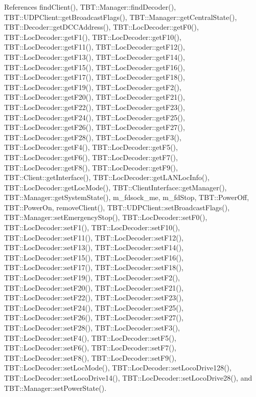 References find\+Client(), T\+B\+T\+::\+Manager\+::find\+Decoder(), T\+B\+T\+::\+U\+D\+P\+Client\+::get\+Broadcast\+Flags(), T\+B\+T\+::\+Manager\+::get\+Central\+State(), T\+B\+T\+::\+Decoder\+::get\+D\+C\+C\+Address(), T\+B\+T\+::\+Loc\+Decoder\+::get\+F0(), T\+B\+T\+::\+Loc\+Decoder\+::get\+F1(), T\+B\+T\+::\+Loc\+Decoder\+::get\+F10(), T\+B\+T\+::\+Loc\+Decoder\+::get\+F11(), T\+B\+T\+::\+Loc\+Decoder\+::get\+F12(), T\+B\+T\+::\+Loc\+Decoder\+::get\+F13(), T\+B\+T\+::\+Loc\+Decoder\+::get\+F14(), T\+B\+T\+::\+Loc\+Decoder\+::get\+F15(), T\+B\+T\+::\+Loc\+Decoder\+::get\+F16(), T\+B\+T\+::\+Loc\+Decoder\+::get\+F17(), T\+B\+T\+::\+Loc\+Decoder\+::get\+F18(), T\+B\+T\+::\+Loc\+Decoder\+::get\+F19(), T\+B\+T\+::\+Loc\+Decoder\+::get\+F2(), T\+B\+T\+::\+Loc\+Decoder\+::get\+F20(), T\+B\+T\+::\+Loc\+Decoder\+::get\+F21(), T\+B\+T\+::\+Loc\+Decoder\+::get\+F22(), T\+B\+T\+::\+Loc\+Decoder\+::get\+F23(), T\+B\+T\+::\+Loc\+Decoder\+::get\+F24(), T\+B\+T\+::\+Loc\+Decoder\+::get\+F25(), T\+B\+T\+::\+Loc\+Decoder\+::get\+F26(), T\+B\+T\+::\+Loc\+Decoder\+::get\+F27(), T\+B\+T\+::\+Loc\+Decoder\+::get\+F28(), T\+B\+T\+::\+Loc\+Decoder\+::get\+F3(), T\+B\+T\+::\+Loc\+Decoder\+::get\+F4(), T\+B\+T\+::\+Loc\+Decoder\+::get\+F5(), T\+B\+T\+::\+Loc\+Decoder\+::get\+F6(), T\+B\+T\+::\+Loc\+Decoder\+::get\+F7(), T\+B\+T\+::\+Loc\+Decoder\+::get\+F8(), T\+B\+T\+::\+Loc\+Decoder\+::get\+F9(), T\+B\+T\+::\+Client\+::get\+Interface(), T\+B\+T\+::\+Loc\+Decoder\+::get\+L\+A\+N\+Loc\+Info(), T\+B\+T\+::\+Loc\+Decoder\+::get\+Loc\+Mode(), T\+B\+T\+::\+Client\+Interface\+::get\+Manager(), T\+B\+T\+::\+Manager\+::get\+System\+State(), m\+\_\+fdsock\+\_\+me, m\+\_\+fd\+Stop, T\+B\+T\+::\+Power\+Off, T\+B\+T\+::\+Power\+On, remove\+Client(), T\+B\+T\+::\+U\+D\+P\+Client\+::set\+Broadcast\+Flags(), T\+B\+T\+::\+Manager\+::set\+Emergency\+Stop(), T\+B\+T\+::\+Loc\+Decoder\+::set\+F0(), T\+B\+T\+::\+Loc\+Decoder\+::set\+F1(), T\+B\+T\+::\+Loc\+Decoder\+::set\+F10(), T\+B\+T\+::\+Loc\+Decoder\+::set\+F11(), T\+B\+T\+::\+Loc\+Decoder\+::set\+F12(), T\+B\+T\+::\+Loc\+Decoder\+::set\+F13(), T\+B\+T\+::\+Loc\+Decoder\+::set\+F14(), T\+B\+T\+::\+Loc\+Decoder\+::set\+F15(), T\+B\+T\+::\+Loc\+Decoder\+::set\+F16(), T\+B\+T\+::\+Loc\+Decoder\+::set\+F17(), T\+B\+T\+::\+Loc\+Decoder\+::set\+F18(), T\+B\+T\+::\+Loc\+Decoder\+::set\+F19(), T\+B\+T\+::\+Loc\+Decoder\+::set\+F2(), T\+B\+T\+::\+Loc\+Decoder\+::set\+F20(), T\+B\+T\+::\+Loc\+Decoder\+::set\+F21(), T\+B\+T\+::\+Loc\+Decoder\+::set\+F22(), T\+B\+T\+::\+Loc\+Decoder\+::set\+F23(), T\+B\+T\+::\+Loc\+Decoder\+::set\+F24(), T\+B\+T\+::\+Loc\+Decoder\+::set\+F25(), T\+B\+T\+::\+Loc\+Decoder\+::set\+F26(), T\+B\+T\+::\+Loc\+Decoder\+::set\+F27(), T\+B\+T\+::\+Loc\+Decoder\+::set\+F28(), T\+B\+T\+::\+Loc\+Decoder\+::set\+F3(), T\+B\+T\+::\+Loc\+Decoder\+::set\+F4(), T\+B\+T\+::\+Loc\+Decoder\+::set\+F5(), T\+B\+T\+::\+Loc\+Decoder\+::set\+F6(), T\+B\+T\+::\+Loc\+Decoder\+::set\+F7(), T\+B\+T\+::\+Loc\+Decoder\+::set\+F8(), T\+B\+T\+::\+Loc\+Decoder\+::set\+F9(), T\+B\+T\+::\+Loc\+Decoder\+::set\+Loc\+Mode(), T\+B\+T\+::\+Loc\+Decoder\+::set\+Loco\+Drive128(), T\+B\+T\+::\+Loc\+Decoder\+::set\+Loco\+Drive14(), T\+B\+T\+::\+Loc\+Decoder\+::set\+Loco\+Drive28(), and T\+B\+T\+::\+Manager\+::set\+Power\+State().



